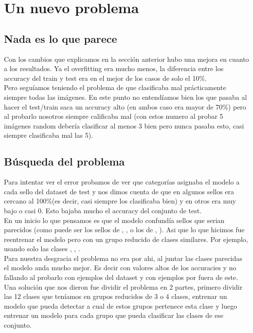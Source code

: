\documentclass[12pt, titlepage, a4paper]{article}
\begin{document}
\section{Un nuevo problema}
\subsection{Nada es lo que parece}
Con los cambios que explicamos en la sección anterior hubo una mejora en cuanto a los resultados. Ya el overfitting era mucho menos, la diferencia entre los accuracy del train y test era en el mejor de los casos de solo el 10\%.\\

Pero seguíamos teniendo el problema de que clasificaba mal prácticamente siempre todas las imágenes. En este punto no entendíamos bien los que pasaba al hacer el test/train saca un accuracy alto (en ambos caso era mayor de 70\%) pero al probarlo nosotros siempre calificaba mal (con estos numero al probar 5 imágenes random debería clasificar al menos 3 bien pero nunca pasaba esto, casi siempre clasificaba mal las 5).

\subsection{Búsqueda del problema}
Para intentar ver el error probamos de ver que categorías asignaba el modelo a cada sello del dataset de test y nos dimos cuenta de que en algunos sellos era cercano al 100\%(es decir, casi siempre los clasificaba bien) y en otros era muy bajo o casi 0. Esto bajaba mucho el accuracy del conjunto de test.\\

En un inicio lo que pensamos es que el modelo confundía sellos que serian parecidos (como puede ser los sellos de , ,  o los de , ). Asi que lo que hicimos fue reentrenar el modelo pero con un grupo reducido de clases similares. Por ejemplo, usando solo las clases , , .\\

Para nuestra desgracia el problema no era por ahi, al juntar las clases parecidas el modelo anda mucho mejor. Es decir con valores altos de los accuracies y no fallando al probarlo con ejemplos del dataset y con ejemplos por fuera de este.\\

Una solución que nos dieron fue dividir el problema en 2 partes, primero dividir las 12 clases que teníamos en grupos reducidos de 3 o 4 clases, entrenar un modelo que pueda detectar a cual de estos grupos pertenece esta clase y luego entrenar un modelo para cada grupo que pueda clasificar las clases de ese conjunto.\\
\end{document}
